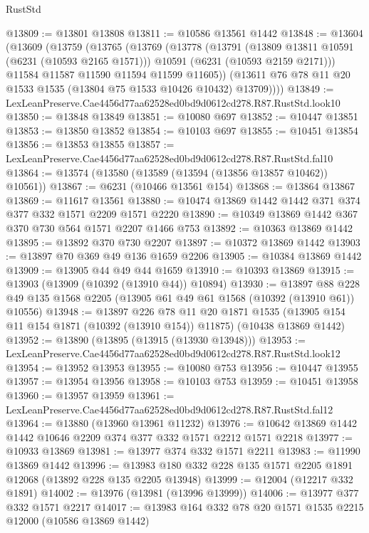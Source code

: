 \begin{lexlean}{RustStd}
\begin{coremodule}
{{@13809 := @13801 @13808
@13811 := @10586 @13561 @1442
@13848 := @13604
    (@13609
      (@13759
        (@13765
          (@13769
            (@13778
              (@13791
                (@13809 @13811 @10591 (@6231 (@10593 @2165 @1571)))
                @10591
                (@6231 (@10593 @2159 @2171)))
              @11584
              @11587
              @11590
              @11594
              @11599
              @11605))
          (@13611 @76 @78 @11 @20 @1533 @1535 (@13804 @75 @1533 @10426 @10432) @13709))))
@13849 := LexLeanPreserve.Cae4456d77aa62528ed0bd9d0612cd278.R87.RustStd.look10
@13850 := @13848 @13849
@13851 := @10080 @697
@13852 := @10447 @13851
@13853 := @13850 @13852
@13854 := @10103 @697
@13855 := @10451 @13854
@13856 := @13853 @13855
@13857 := LexLeanPreserve.Cae4456d77aa62528ed0bd9d0612cd278.R87.RustStd.fal10
@13864 := @13574 (@13580 (@13589 (@13594 (@13856 @13857 @10462)) @10561))
@13867 := @6231 (@10466 @13561 @154)
@13868 := @13864 @13867
@13869 := @11617 @13561
@13880 := @10474 @13869 @1442 @1442 @371 @374 @377 @332 @1571 @2209 @1571 @2220
@13890 := @10349 @13869 @1442 @367 @370 @730 @564 @1571 @2207 @1466 @753
@13892 := @10363 @13869 @1442
@13895 := @13892 @370 @730 @2207
@13897 := @10372 @13869 @1442
@13903 := @13897 @70 @369 @49 @136 @1659 @2206
@13905 := @10384 @13869 @1442
@13909 := @13905 @44 @49 @44 @1659
@13910 := @10393 @13869
@13915 := @13903 (@13909 (@10392 (@13910 @44)) @10894)
@13930 := @13897
    @88
    @228
    @49
    @135
    @1568
    @2205
    (@13905 @61 @49 @61 @1568 (@10392 (@13910 @61)) @10556)
@13948 := @13897
    @226
    @78
    @11
    @20
    @1871
    @1535
    (@13905 @154 @11 @154 @1871 (@10392 (@13910 @154)) @11875)
    (@10438 @13869 @1442)
@13952 := @13890 (@13895 (@13915 (@13930 @13948)))
@13953 := LexLeanPreserve.Cae4456d77aa62528ed0bd9d0612cd278.R87.RustStd.look12
@13954 := @13952 @13953
@13955 := @10080 @753
@13956 := @10447 @13955
@13957 := @13954 @13956
@13958 := @10103 @753
@13959 := @10451 @13958
@13960 := @13957 @13959
@13961 := LexLeanPreserve.Cae4456d77aa62528ed0bd9d0612cd278.R87.RustStd.fal12
@13964 := @13880 (@13960 @13961 @11232)
@13976 := @10642 @13869 @1442 @1442 @10646 @2209 @374 @377 @332 @1571 @2212 @1571 @2218
@13977 := @10933 @13869
@13981 := @13977 @374 @332 @1571 @2211
@13983 := @11990 @13869 @1442
@13996 := @13983 @180 @332 @228 @135 @1571 @2205 @1891 @12068 (@13892 @228 @135 @2205 @13948)
@13999 := @12004 (@12217 @332 @1891)
@14002 := @13976 (@13981 (@13996 @13999))
@14006 := @13977 @377 @332 @1571 @2217
@14017 := @13983 @164 @332 @78 @20 @1571 @1535 @2215 @12000 (@10586 @13869 @1442)
}}
\end{coremodule}
\end{lexlean}
